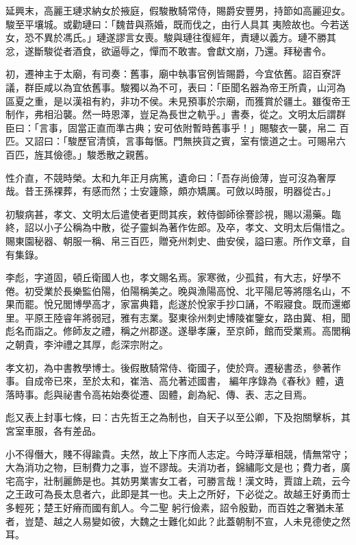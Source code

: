 \begin{pinyinscope}
 延興末，高麗王璉求納女於掖庭，假駿散騎常侍，賜爵安豐男，持節如高麗迎女。駿至平壤城。或勸璉曰：「魏昔與燕婚，既而伐之，由行人具其
 夷險故也。今若送女，恐不異於馮氏。」璉遂謬言女喪。駿與璉往復經年，責璉以義方。璉不勝其忿，遂斷駿從者酒食，欲逼辱之，憚而不敢害。會獻文崩，乃還。拜秘書令。



 初，遷神主于太廟，有司奏：舊事，廟中執事官例皆賜爵，今宜依舊。詔百寮評議，群臣咸以為宜依舊事。駿獨以為不可，表曰：「臣聞名器為帝王所貴，山河為區夏之重，是以漢祖有約，非功不侯。未見預事於宗廟，而獲賞於疆土。雖復帝王制作，弗相沿襲。然一時恩澤，豈足為長世之軌乎。」書奏，從之。文明太后謂群臣曰：「言事，固當正直而準古典；安可依附暫時舊事乎！」賜駿衣一襲，帛二
 百匹。又詔曰：「駿歷官清慎，言事每愜。門無挾貨之賓，室有懷道之士。可賜帛六百匹，旌其儉德。」駿悉散之親舊。



 性介直，不競時榮。太和九年正月病篤，遺命曰：「吾存尚儉薄，豈可沒為奢厚哉。昔王孫裸葬，有感而然；士安籧篨，頗亦矯厲。可斂以時服，明器從古。」



 初駿病甚，孝文、文明太后遣使者更問其疾，敕侍御師徐謇診視，賜以湯藥。臨終，詔以小子公稱為中散，從子靈虯為著作佐郎。及卒，孝文、文明太后傷惜之。賜東園秘器、朝服一稱、帛三百匹，贈兗州刺史、曲安侯，謚曰憲。所作文章，自有集錄。



 李彪，字道固，頓丘衛國人也，孝文賜名焉。家寒微，少孤貧，有大志，好學不倦。初受業於長樂監伯陽，伯陽稱美之。晚與漁陽高悅、北平陽尼等將隱名山，不果而罷。悅兄閭博學高才，家富典籍，彪遂於悅家手抄口誦，不暇寢食。既而還鄉里。平原王陸睿年將弱冠，雅有志業。娶東徐州刺史博陵崔鑒女，路由冀、相，聞彪名而詣之。修師友之禮，稱之州郡遂。遂舉孝廉，至京師，館而受業焉。高閭稱之朝貴，李沖禮之其厚，彪深宗附之。



 孝文初，為中書教學博士。後假散騎常侍、衛國子，使於齊。遷秘書丞，參著作事。自成帝已來，至於太和，崔浩、高允著述國書，
 編年序錄為《春秋》體，遺落時事。彪與祕書令高祐始奏從遷、固體，創為紀、傳、表、志之目焉。



 彪又表上封事七條，曰：古先哲王之為制也，自天子以至公卿，下及抱關擊柝，其宮室車服，各有差品。



 小不得僭大，賤不得踰貴。夫然，故上下序而人志定。今時浮華相競，情無常守；大為消功之物，巨制費力之事，豈不謬哉。夫消功者，錦繡彫文是也；費力者，廣宅高宇，壯制麗飾是也。其妨男業害女工者，可勝言哉！漢文時，賈誼上疏，云今之王政可為長太息者六，此即是其一也。夫上之所好，下必從之。故越王好勇而士多輕死；楚王好瘠而國有飢人。今二聖
 躬行儉素，詔令殷勤，而百姓之奢猶未革者，豈楚、越之人易變如彼，大魏之士難化如此？此蓋朝制不宣，人未見德使之然耳。




\end{pinyinscope}
